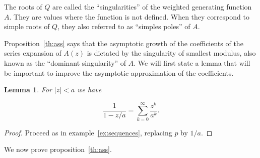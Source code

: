 \documentclass{article}
\newtheorem{lemma}{Lemma}
\begin{document}
The roots of $Q$ are called the ``singularities'' of the weighted
generating function $A$. They are values where the function is not
defined. When they correspond to simple roots of $Q$, they also referred
to as ``simples poles'' of $A$.

Proposition~\ref{th:ass} says that the asymptotic growth of the
coefficients of the series expansion of $A(z)$ is dictated by the
singularity of smallest modulus, also known as the ``dominant
singularity'' of $A$. We will first state a lemma that will be
important to improve the asymptotic approximation of the coefficients.

\begin{lemma}
\label{lemma:poles}
For $|z| < a$ we have

\begin{equation}
\label{eq:poles}
\frac{1}{1-z/a} = \sum_{k=0}^\infty \frac{z^k}{a^k}.
\end{equation}
\end{lemma}

\begin{proof}
Proceed as in example~\ref{ex:sequences}, replacing $p$ by $1/a$.
\end{proof}

We now prove proposition~\ref{th:ass}.
\end{document}
